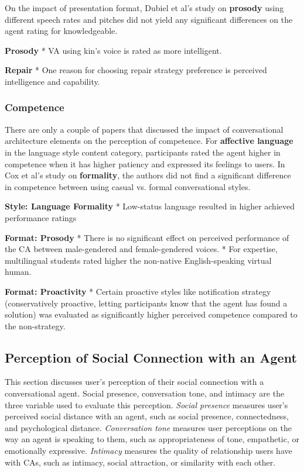 \documentclass[sigconf,screen,review, anonymous]{acmart}
\newcommand{\cmt}[1]{}%
\begin{document}
On the impact of presentation format, Dubiel et al's study on \textbf{prosody} using different speech rates and pitches did not yield any significant differences on the agent rating for knowledgeable.

\textbf{Prosody}
* VA using kin's voice is rated as more intelligent. \cite{chan2021kinvoices}\cmt{[74]}

\textbf{Repair}
* One reason for choosing repair strategy preference is perceived intelligence and capability. \cite{ashktorab2019resilient}\cmt{[88]}

\subsubsection{Competence}

There are only a couple of papers that discussed the impact of conversational architecture elements on the perception of competence. For \textbf{affective language} in the language style content category, participants rated the agent higher in competence when it has higher patiency and expressed its feelings to users. In Cox et al's study on \textbf{formality}, the authors did not find a significant difference in competence between using casual vs. formal conversational styles.

\textbf{Style: Language Formality}
*  Low-status language resulted in higher achieved performance ratings \cite{habler2019effects}\cmt{[63]}

\textbf{Format: Prosody}
* There is no significant effect on perceived performance of the CA between male-gendered and female-gendered voices. \cite{habler2019effects}\cmt{[63]}
* For expertise, multilingual students rated higher the non-native English-speaking virtual human. \cite{feijoo2021effects}\cmt{[70]}

\textbf{Format: Proactivity}
* Certain proactive styles like notification strategy (conservatively proactive, letting participants know that the agent has found a solution) was evaluated as significantly higher perceived competence compared to the non-strategy. \cite{kraus2020effects}\cmt{[64]}



\subsection{Perception of Social Connection with an Agent}

This section discusses user's perception of their social connection with a conversational agent. Social presence, conversation tone, and intimacy are the three variable used to evaluate this perception. \textit{Social presence} measures user's perceived social distance with an agent, such as social presence, connectedness, and psychological distance. \textit{Conversation tone} measures user perceptions on the way an agent is speaking to them, such as appropriateness of tone, empathetic, or emotionally expressive. \textit{Intimacy} measures the quality of relationship users have with CAs, such as intimacy, social attraction, or similarity with each other.
\end{document}
